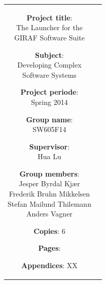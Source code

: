     \begin{tabular}{cc}
	
        \parbox[3cm]{7cm}{ %
	\vspace{7mm}
            \begin{description}
                \item {\textbf{Project title}:} \\
                    The Launcher for the\\
                    GIRAF Software Suite
                    \hspace{4cm}
                \item {\textbf{Subject}:} \\
                  Developing Complex \\
                  Software Systems
            \end{description}
	\vspace{-4mm}
            \parbox{8cm}{ %
                \begin{description}
                    \item {\textbf{Project periode}:} \\
                        Spring 2014
                    \hspace{4cm}
                    \item {\textbf{Group name}:} \\
                        SW605F14
                    \hspace{4cm}
                    \item {\textbf{Supervisor}:} \\
                        Hua Lu
                    \item {\textbf{Group members}:}\\%
                    Jesper Byrdal Kjær\\[0.20cm]
                    Frederik Bruhn Mikkelsen\\[0.20cm]
					Stefan Mailund Thilemann\\[0.20cm]
					Anders Vagner
                \end{description}
            }
	    \vspace{-4mm}
            \begin{description}
                \item {\textbf{Copies}:} 6
                \item {\textbf{Pages}:} \pageref{LastPage}
                \item {\textbf{Appendices}: XX} 

\end{description}}
\end{tabular}
